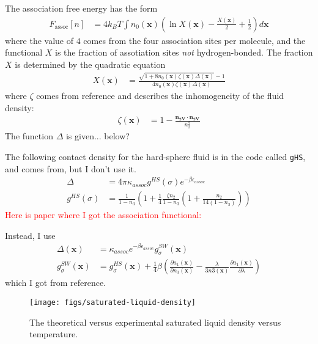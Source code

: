 \documentclass[letterpaper,twocolumn,amsmath,amssymb,prb]{revtex4-1}
\newcommand{\xx}{\textbf{x}}
\begin{document}
The association free energy has the form
\begin{align}
  F_\text{assoc}[n] &= 4 k_BT \int n_0(\xx)
  \left(\ln X(\xx) - \frac{X(\xx)}{2} + \frac12\right) d\xx
\end{align}
where the value of $4$ comes from the four association sites per
molecule, and the functional $X$ is the fraction of assotiation sites
\emph{not} hydrogen-bonded.  The fraction $X$ is determined by the
quadratic equation
\begin{align}
  X(\xx) &= \frac{\sqrt{1 + 8n_0(\xx)\zeta(\xx)\Delta(\xx)} - 1}
  {4 n_0(\xx)\zeta(\xx)\Delta(\xx)}
\end{align}
where $\zeta$ comes from
reference\cite{yu2002fmt-dft-inhomogeneous-associating,
  fu2005vapor-liquid-dft} and describes the inhomogeneity of the fluid
density:
\begin{align}
  \zeta(\xx) &= 1 - \frac{\mathbf{n_{2V}}\cdot\mathbf{n_{2V}}}{n_2^2}
\end{align}
The function $\Delta$ is given... below?

The following contact density for the hard-sphere fluid is in the code
called \texttt{gHS}, and comes
from\cite{yu2002fmt-dft-inhomogeneous-associating,
  fu2005vapor-liquid-dft}, but I don't use it.
\begin{align}
  \Delta &= 4\pi \kappa_\textit{assoc} g^\textit{HS}(\sigma)e^{-\beta
    \epsilon_\textit{assoc}} \\
  g^\textit{HS}(\sigma) &= \frac1{1-n_3}\left(1+\frac14\frac{\zeta n_2}{1-n_3}
  \left(1 + \frac{n_2}{14 (1-n_3)}\right)\right)
\end{align}
\textcolor{red}{Here is paper where I got the association functional:}

Instead, I use
\begin{align}
  \Delta(\xx) &= \kappa_\textit{assoc}
  e^{-\beta\epsilon_\textit{assoc}} g^\textit{SW}_\sigma(\xx) \\
  g^\textit{SW}_\sigma(\xx) &= g^\textit{HS}_\sigma(\xx) +
  \frac{1}{4}\beta\left(\frac{\partial a_1(\xx)}{\partial n_3(\xx)} -
  \frac{\lambda}{3 n3(\xx)}\frac{\partial a_1(\xx)}{\partial \lambda}\right)
\end{align}
which I got from reference\cite{gil-villegas-1997-SAFT-VR}.

\begin{figure}
\begin{center}
\texttt{[image: figs/saturated-liquid-density]}
\end{center}
\caption{The theoretical versus experimental saturated liquid density
  versus temperature.  }
\label{fig:saturated-liquid-density}
\end{figure}
\end{document}
